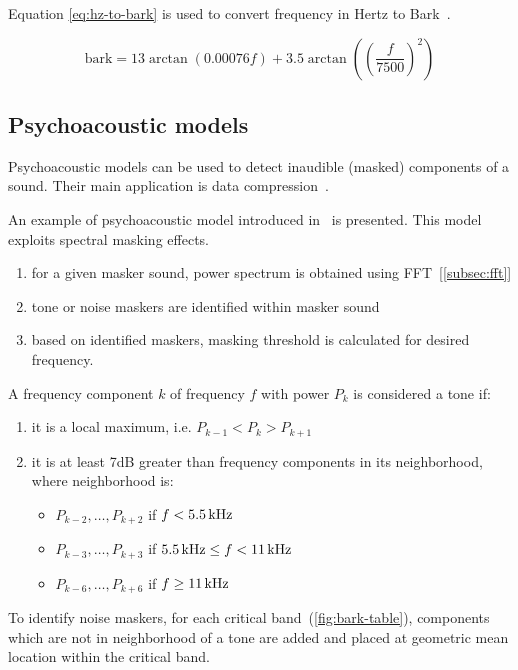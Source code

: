 Equation \ref{eq:hz-to-bark} is used to convert frequency in Hertz to Bark~\cite{Bark}.

\begin{equation}
\label{eq:hz-to-bark}
\textrm{bark} = 13\arctan(0.00076f) + 3.5\arctan((\frac{f}{7500})^{2})
\end{equation}

\subsection{Psychoacoustic models}
\label{subsec:psychoacoustic-model}

Psychoacoustic models can be used to detect inaudible (masked) components of a sound. Their main application is data compression~\cite{MPEG}.

An example of psychoacoustic model introduced in~\cite{WAVS} is presented. This model exploits spectral masking effects.

\begin{enumerate}
\item for a given masker sound, power spectrum is obtained using FFT~[\ref{subsec:fft}]
\item tone or noise maskers are identified within masker sound
\item based on identified maskers, masking threshold is calculated for desired frequency.
\end{enumerate}

A frequency component $k$ of frequency $f$ with power $P_{k}$ is considered a tone if:
\begin{enumerate}
\item it is a local maximum, i.e. $P_{k-1} < P_{k} > P_{k+1}$
\item it is at least 7dB greater than frequency components in its neighborhood, where neighborhood is:
  \begin{itemize}
  \item $P_{k-2}, \ldots, P_{k+2}$ if $f < \textrm{5.5\,kHz}$
  \item $P_{k-3}, \ldots, P_{k+3}$ if $\textrm{5.5\,kHz} \leq f < \textrm{11\,kHz}$
  \item $P_{k-6}, \ldots, P_{k+6}$ if $f \geq \textrm{11\,kHz}$
  \end{itemize}
\end{enumerate}

To identify noise maskers, for each critical band~(\ref{fig:bark-table}), components which are not in neighborhood of a tone are added and placed at geometric mean location within the critical band.

